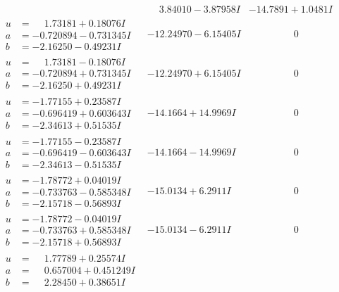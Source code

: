 \documentclass[1p]{elsarticle_modified}
\theoremstyle{definition}
\begin{document}
$$\begin{array}{c|c|c}
 & \phantom{-}3.84010 - 3.87958 I & -14.7891 + 1.0481 I \\ \hline\begin{aligned}
u &= \phantom{-}1.73181 + 0.18076 I \\
a &= -0.720894 - 0.731345 I \\
b &= -2.16250 - 0.49231 I\end{aligned}
 & -12.24970 - 6.15405 I & \phantom{-0.000000 } 0 \\ \hline\begin{aligned}
u &= \phantom{-}1.73181 - 0.18076 I \\
a &= -0.720894 + 0.731345 I \\
b &= -2.16250 + 0.49231 I\end{aligned}
 & -12.24970 + 6.15405 I & \phantom{-0.000000 } 0 \\ \hline\begin{aligned}
u &= -1.77155 + 0.23587 I \\
a &= -0.696419 + 0.603643 I \\
b &= -2.34613 + 0.51535 I\end{aligned}
 & -14.1664 + 14.9969 I & \phantom{-0.000000 } 0 \\ \hline\begin{aligned}
u &= -1.77155 - 0.23587 I \\
a &= -0.696419 - 0.603643 I \\
b &= -2.34613 - 0.51535 I\end{aligned}
 & -14.1664 - 14.9969 I & \phantom{-0.000000 } 0 \\ \hline\begin{aligned}
u &= -1.78772 + 0.04019 I \\
a &= -0.733763 - 0.585348 I \\
b &= -2.15718 - 0.56893 I\end{aligned}
 & -15.0134 + 6.2911 I & \phantom{-0.000000 } 0 \\ \hline\begin{aligned}
u &= -1.78772 - 0.04019 I \\
a &= -0.733763 + 0.585348 I \\
b &= -2.15718 + 0.56893 I\end{aligned}
 & -15.0134 - 6.2911 I & \phantom{-0.000000 } 0 \\ \hline\begin{aligned}
u &= \phantom{-}1.77789 + 0.25574 I \\
a &= \phantom{-}0.657004 + 0.451249 I \\
b &= \phantom{-}2.28450 + 0.38651 I\end{aligned}

\end{array}$$
\end{document}
